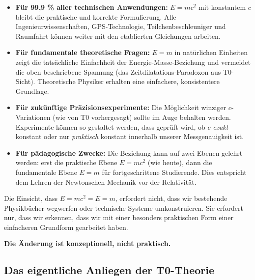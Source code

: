 	\begin{itemize}
		\item \textbf{Für 99,9 \% aller technischen Anwendungen:} \( E = mc^2 \) mit konstantem \( c \) bleibt die praktische und korrekte Formulierung. Alle Ingenieurwissenschaften, GPS-Technologie, Teilchenbeschleuniger und Raumfahrt können weiter mit den etablierten Gleichungen arbeiten.
		
		\item \textbf{Für fundamentale theoretische Fragen:} \( E = m \) in natürlichen Einheiten zeigt die tatsächliche Einfachheit der Energie-Masse-Beziehung und vermeidet die oben beschriebene Spannung (das Zeitdilatations-Paradoxon aus T0-Sicht). Theoretische Physiker erhalten eine einfachere, konsistentere Grundlage.
		
		\item \textbf{Für zukünftige Präzisionsexperimente:} Die Möglichkeit winziger \( c \)-Variationen (wie von T0 vorhergesagt) sollte im Auge behalten werden. Experimente können so gestaltet werden, dass geprüft wird, ob \( c \) \textit{exakt} konstant oder nur \textit{praktisch} konstant innerhalb unserer Messgenauigkeit ist.
		
		\item \textbf{Für pädagogische Zwecke:} Die Beziehung kann auf zwei Ebenen gelehrt werden: erst die praktische Ebene \( E = mc^2 \) (wie heute), dann die fundamentale Ebene \( E = m \) für fortgeschrittene Studierende. Dies entspricht dem Lehren der Newtonschen Mechanik vor der Relativität.
	\end{itemize}
	
	\begin{tcolorbox}[colback=yellow!10!white,colframe=yellow!75!black,title=Die friedliche Erweiterung]
		Die Einsicht, dass \( E = mc^2 = E = m \), erfordert nicht, dass wir bestehende Physikbücher wegwerfen oder technische Systeme umkonstruieren. Sie erfordert nur, dass wir erkennen, dass wir mit einer besonders praktischen Form einer einfacheren Grundform gearbeitet haben.
		
		\textbf{Die Änderung ist konzeptionell, nicht praktisch.}
	\end{tcolorbox}
	
	\subsection{Das eigentliche Anliegen der T0-Theorie}
	
